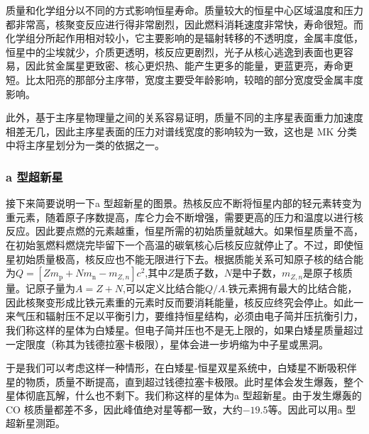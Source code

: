 \documentclass[../天体物理基础.tex]{subfiles}
\begin{document}
质量和化学组分以不同的方式影响恒星寿命。质量较大的恒星中心区域温度和压力都非常高，核聚变反应进行得非常剧烈，因此燃料消耗速度非常快，寿命很短。而化学组分所起作用相对较小，它主要影响的是辐射转移的不透明度，金属丰度低，恒星中的尘埃就少，介质更透明，核反应更剧烈，光子从核心逃逸到表面也更容易，因此贫金属星更致密、核心更炽热、能产生更多的能量，更蓝更亮，寿命更短。比太阳亮的那部分主序带，宽度主要受年龄影响，较暗的部分宽度受金属丰度影响。

此外，基于主序星物理量之间的关系容易证明，质量不同的主序星表面重力加速度相差无几，因此主序星表面的压力对谱线宽度的影响较为一致，这也是 MK 分类中将主序星划分为一类的依据之一。

\subsubsection{\uppercase\expandafter{}a 型超新星}
接下来简要说明一下\uppercase\expandafter{}a 型超新星的图景。热核反应不断将恒星内部的轻元素转变为重元素，随着原子序数提高，库仑力会不断增强，需要更高的压力和温度以进行核反应。因此要点燃的元素越重，恒星所需的初始质量就越大。如果恒星质量不高，在初始氢燃料燃烧完毕留下一个高温的碳氧核心后核反应就停止了。不过，即使恒星初始质量极高，核反应也不能无限进行下去。根据质能关系可知原子核的结合能为$Q=\left[Zm_{\text{p}}+Nm_{\text{n}}-m_{Z,n}\right]c^{2}$,其中$Z$是质子数，$N$是中子数，$m_{Z,n}$是原子核质量。记原子量为$A=Z+N$,可以定义比结合能$Q/A$.铁元素拥有最大的比结合能，因此核聚变形成比铁元素重的元素时反而要消耗能量，核反应终究会停止。如此一来气压和辐射压不足以平衡引力，要维持恒星结构，必须由电子简并压抗衡引力，我们称这样的星体为白矮星。但电子简并压也不是无上限的，如果白矮星质量超过一定限度（称其为钱德拉塞卡极限），星体会进一步坍缩为中子星或黑洞。

于是我们可以考虑这样一种情形，在白矮星{}-{}恒星双星系统中，白矮星不断吸积伴星的物质，质量不断提高，直到超过钱德拉塞卡极限。此时星体会发生爆轰，整个星体彻底瓦解，什么也不剩下。我们称这样的星体为\uppercase\expandafter{}a 型超新星。由于发生爆轰的 CO 核质量都差不多，因此峰值绝对星等都一致，大约$-19.5$等。因此可以用\uppercase\expandafter{}a 型超新星测距。
\end{document}
